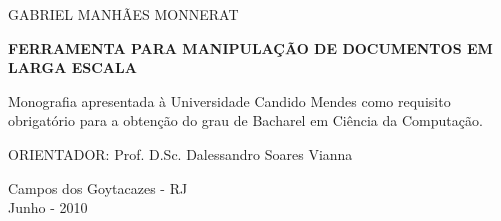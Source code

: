 \thispagestyle{empty}

\begin{spacing}{1.0}

\begin{center}
\begin{large}
\uppercase{
Gabriel Manhães Monnerat} \\[0.2 cm]
\end{large}
\end{center}

\vspace {5 cm}

\begin{spacing}{1.5}
\begin{center}
\begin{Large}
{\bf \uppercase{Ferramenta para manipulação de documentos em larga escala}}
\end{Large}
\end{center}
\end{spacing}

\vspace {2 cm}

\begin{flushright}
\begin{minipage}[t]{8.5 cm}
Monografia apresentada à Universidade Candido Mendes como requisito obrigatório para a obtenção do grau de Bacharel em Ciência da Computação.
\end{minipage}
\end{flushright}

\vspace {1.5 cm}

\begin{center}
\begin{large}
ORIENTADOR: Prof. D.Sc. Dalessandro Soares Vianna\\[0.2 cm]
\end{large}
\end{center}

\vspace {1.5 cm}

\begin{center}
\begin{large}
Campos dos Goytacazes - RJ\\[0.2 cm]
Junho - 2010
\end{large}
\end{center}

\end{spacing}
\newpage


